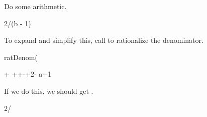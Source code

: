 {{{{{{{{\begin{xtc}
\begin{xtccomment}
Do some arithmetic.
\end{xtccomment}
\begin{spadsrc}
2/(b - 1) 
\end{spadsrc}
\begin{TeXOutput}
\begin{fricasmath}{33}
%
\end{fricasmath}
\end{TeXOutput}
\end{xtc}
\begin{xtc}
\begin{xtccomment}
To expand and simplify this, call 
to rationalize the denominator.
\end{xtccomment}
\begin{spadsrc}
ratDenom(%
\end{spadsrc}
\begin{TeXOutput}
\begin{fricasmath}{34}
\TIMES {}+%
\TIMES {}+\TIMES {}+-{}+2\TIMES {}-{\SYMBOL%
{a}}+1%
\end{fricasmath}
\end{TeXOutput}
\end{xtc}
\begin{xtc}
\begin{xtccomment}
If we do this, we should get .
\end{xtccomment}
\begin{spadsrc}
2/%
\end{spadsrc}
\begin{TeXOutput}
\begin{fricasmath}{35}
\end{fricasmath}
\end{TeXOutput}
\end{xtc}}}}}}}}}

